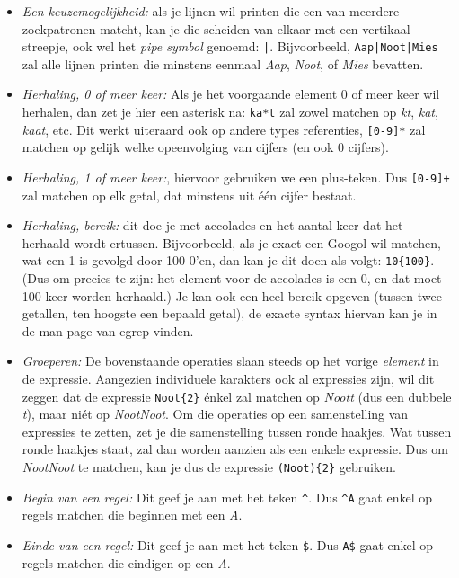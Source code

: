 \documentclass[a4paper,twoside,openany]{memoir}
\begin{document}
\begin{itemize}
  \item \emph{Een keuzemogelijkheid:} als je lijnen wil printen die een van
    meerdere zoekpatronen matcht, kan je die scheiden van elkaar met een
    vertikaal streepje, ook wel het \emph{pipe symbol} genoemd: \verb!|!.
    Bijvoorbeeld, \verb!Aap|Noot|Mies! zal alle lijnen printen die minstens
    eenmaal \emph{Aap}, \emph{Noot}, of \emph{Mies} bevatten.

  \item \emph{Herhaling, 0 of meer keer:} Als je het voorgaande element 0 of
    meer keer wil herhalen, dan zet je hier een asterisk na: \verb!ka*t! zal
    zowel matchen op \emph{kt}, \emph{kat}, \emph{kaat}, etc. Dit werkt
    uiteraard ook op andere types referenties, \verb![0-9]*! zal matchen op
    gelijk welke opeenvolging van cijfers (en ook 0 cijfers).

  \item \emph{Herhaling, 1 of meer keer:}, hiervoor gebruiken we een plus-teken.
    Dus \verb![0-9]+! zal matchen op elk getal, dat minstens uit \'e\'en cijfer
    bestaat.

  \item \emph{Herhaling, bereik:} dit doe je met accolades en het aantal keer
    dat het herhaald wordt ertussen. Bijvoorbeeld, als je exact een Googol wil
    matchen, wat een 1 is gevolgd door 100 0'en, dan kan je dit doen als volgt:
    \verb!10{100}!. (Dus om precies te zijn: het element voor de accolades is
    een 0, en dat moet 100 keer worden herhaald.) Je kan ook een heel bereik
    opgeven (tussen twee getallen, ten hoogste een bepaald getal), de exacte
    syntax hiervan kan je in de man-page van egrep vinden.

  \item \emph{Groeperen:} De bovenstaande operaties slaan steeds op het vorige
    \emph{element} in de expressie. Aangezien individuele karakters ook al
    expressies zijn, wil dit zeggen dat de expressie \verb!Noot{2}! \'enkel zal
    matchen op \emph{Noott} (dus een dubbele \emph{t}), maar ni\'et op
    \emph{NootNoot}. Om die operaties op een samenstelling van expressies te
    zetten, zet je die samenstelling tussen ronde haakjes. Wat tussen ronde
    haakjes staat, zal dan worden aanzien als een enkele expressie. Dus om
    \emph{NootNoot} te matchen, kan je dus de expressie \verb!(Noot){2}!
    gebruiken.

  \item \emph{Begin van een regel:} Dit geef je aan met het teken \verb!^!. Dus
    \verb!^A! gaat enkel op regels matchen die beginnen met een \emph{A}.

  \item \emph{Einde van een regel:} Dit geef je aan met het teken \verb!$!. Dus
    \verb!A$! gaat enkel op regels matchen die eindigen op een \emph{A}.

\end{itemize}
\end{document}

